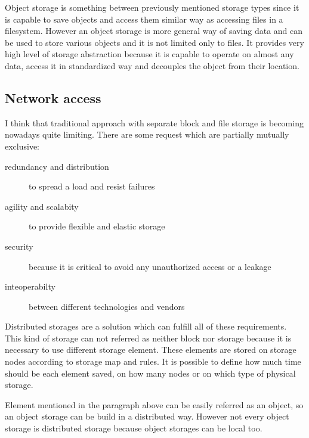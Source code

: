Object storage is something between previously mentioned storage types since it is capable to save objects and access them similar way as accessing files in a filesystem. However an object storage is more general way of saving data and can be used to store various objects and it is not limited only to files. It provides very high level of storage abstraction because it is capable to operate on almost any data, access it in standardized way and decouples the object from their location.
\label{par:object-storage}


\subsection{Network access}
I think that traditional approach with separate block and file storage is becoming nowadays quite limiting. There are some request which are partially mutually exclusive:
\begin{description}
	\item[redundancy and distribution] to spread a load and resist failures
	\item[agility and scalabity] to provide flexible and elastic storage
	\item[security] because it is critical to avoid any unauthorized access or a leakage
	\item[inteoperabilty] between different technologies and vendors
\end{description}

Distributed storages are a solution which can fulfill all of these requirements. This kind of storage can not referred as neither block nor storage because it is necessary to use different storage element. These elements are stored on storage nodes according to storage map and rules. It is possible to define how much time should be each element saved, on how many nodes or on which type of physical storage.

Element mentioned in the paragraph above can be easily referred as an object, so an object storage can be build in a distributed way. However not every object storage is distributed storage because object storages can be local too.


